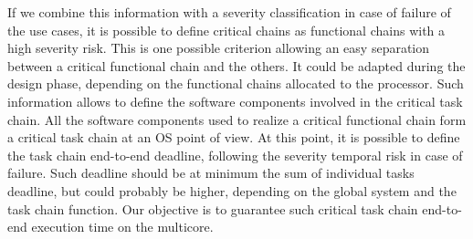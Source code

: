 \documentclass[french, a4paper, 11pt, twoside, pdftex]{StyleThese}
\begin{document}
            If we combine this information with a severity classification in case of failure of the use cases, it is possible to define critical chains as functional chains with a high severity risk. This is one possible criterion allowing an easy separation between a critical functional chain and the others. It could be adapted during the design phase, depending on the functional chains allocated to the processor. 
            \smallbreak
            Such information allows to define the software components involved in the critical task chain. All the software components used to realize a critical functional chain form a critical task chain at an OS point of view. At this point, it is possible to define the task chain end-to-end deadline, following the severity temporal risk in case of failure. Such deadline should be at minimum the sum of individual tasks deadline, but could probably be higher, depending on the global system and the task chain function. Our objective is to guarantee such critical task chain end-to-end execution time on the multicore.
\ifdefined{}
\else


\end{document}
